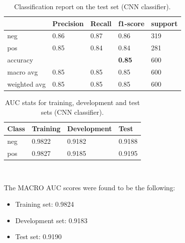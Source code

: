 \documentclass[10pt, a4paper]{article}
\begin{document}
	\begin{table}
		\begin{tabular}{|l|l|l|l|l|}
			\hline
			\cellcolor{blue!25}\textbf{} & \cellcolor{blue!25}\textbf{Precision} &
			\cellcolor{blue!25}\textbf{Recall}  &
			\cellcolor{blue!25}\textbf{f1-score}  &
			\cellcolor{blue!25}\textbf{support}\\
			\hline
			neg & 0.86 & 0.87 & 0.86 & 319 \\\hline
			pos & 0.85  & 0.84 & 0.84 & 281 \\\hline
			accuracy & & & \textbf{0.85} & 600 \\\hline
			macro avg & 0.85 & 0.85 & 0.85 & 600 \\\hline
			weighted avg & 0.85 & 0.85 & 0.85 & 600 \\\hline
			
		\end{tabular}
		\centering
		\caption{Classification report on the test set (CNN classifier).}
		\label{tab::ex-2-report-test}
	\end{table}
	
	\begin{table}
		\begin{tabular}{|l|l|l|l|}
			\hline
			\cellcolor{blue!25}\textbf{Class} & \cellcolor{blue!25}\textbf{Training} & \cellcolor{blue!25}\textbf{Development} & \cellcolor{blue!25}\textbf{Test}\\
			\hline
			neg & 0.9822 & 0.9182 & 0.9188 \\\hline
			pos & 0.9827 & 0.9185 & 0.9195 \\\hline
			
		\end{tabular}
		\centering
		\caption{AUC stats for training, development and test sets (CNN classifier).}
		\label{tab::ex-2-stats-auc}
	\end{table}
	\
	
	The MACRO AUC scores were found to be the following:
	\begin{itemize}
		\item Training set: 0.9824
		\item Development set: 0.9183
		\item Test set: 0.9190
	\end{itemize}
	
	\printbibliography
	
\end{document}
